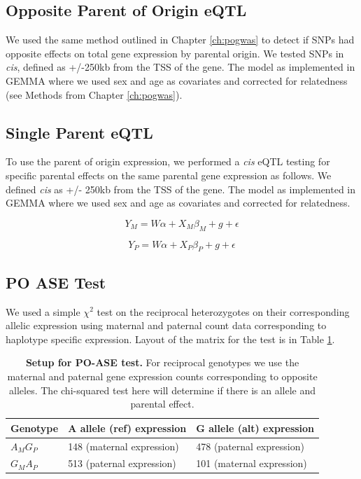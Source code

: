 \subsection{Opposite Parent of Origin eQTL}\label{Opposite Parent of Origin eQTL}
We used the same method outlined in Chapter \ref{ch:pogwas} to detect if SNPs had opposite effects on total gene expression by parental origin. We tested SNPs in \emph{cis}, defined as +/-250kb from the TSS of the gene. The model as implemented in GEMMA\cite{Zhou2012} where we used sex and age as covariates and corrected for relatedness (see Methods from Chapter  \ref{ch:pogwas}).

\subsection{Single Parent eQTL}\label{Single Parent eQTL}
To use the parent of origin expression, we performed a \emph{cis} eQTL testing for specific parental effects on the same parental gene expression as follows. We defined \emph{cis} as +/- 250kb from the TSS of the gene. The model as implemented in GEMMA\cite{Zhou2012} where we used sex and age as covariates and corrected for relatedness. 

\begin{equation}
Y _{M}=W\alpha + X_{M}\beta_{M}+g+\epsilon
\end{equation}

\begin{equation}
Y _{P}=W\alpha + X_{P}\beta_{P}+g+\epsilon
\end{equation}


\subsection{PO ASE Test}\label{PO ASE Test}
We used a simple $\chi^2$ test on the reciprocal heterozygotes on their corresponding allelic expression using maternal and paternal count data corresponding to haplotype specific expression. Layout of the matrix for the test is in Table \ref{tab:chi}.

\begin{table}[!htb]
\centering
\begin{tabular}{@{}p{3cm}|p{5cm}p{5cm}@{}}
 \toprule  Genotype & A allele (ref) expression & G allele (alt) expression \\ \midrule
 $A_{M}G_{P}$ & 148  (maternal expression) & 478 (paternal expression) \\
 $G_{M}A_{P}$ & 513 (paternal expression) & 101 (maternal expression) \\
 \bottomrule
\end{tabular}
\caption[Setup for PO-ASE test.]{\textbf{Setup for PO-ASE test.} For reciprocal genotypes we use the maternal and paternal gene expression counts corresponding to opposite alleles. The chi-squared test here will determine if there is an allele and parental effect.}
\label{tab:chi}
\end{table}



